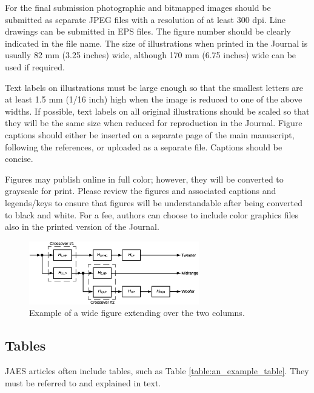 \documentclass[fleqn]{jaes}
\begin{document}
For the final submission photographic and bitmapped images should be submitted as separate JPEG files with a resolution of at least 300 dpi. Line drawings can be submitted in EPS files. The figure number should be clearly indicated in the file name. The size of illustrations when printed in the Journal is usually 82 mm (3.25 inches) wide, although 170 mm (6.75 inches) wide can be used if required. 

Text labels on illustrations must be large enough so that the smallest letters are at least 1.5 mm (1/16 inch) high when the image is reduced to one of the above widths. If possible, text labels on all original illustrations should be scaled so that they will be the same size when reduced for reproduction in the Journal. Figure captions should either be inserted on a separate page of the main manuscript, following the references, or uploaded as a separate file. Captions should be concise.

Figures may publish online in full color; however, they will be converted to grayscale for print. Please review the figures and associated captions and legends/keys to ensure that figures will be understandable after being converted to black and white. For a fee, authors can choose to include color graphics files also in the printed version of the Journal.

\begin{figure}
\centering
\includegraphics[trim=0cm 0.5cm 0cm 0.5cm, width=0.66\textwidth]{fig2_example.eps}
\caption{Example of a wide figure extending over the two columns.}
\label{wide_figure}
\end{figure}

\subsection{Tables}

JAES articles often include tables, such as Table \ref{table:an_example_table}. They must be referred to and explained in text. 
\end{document}
